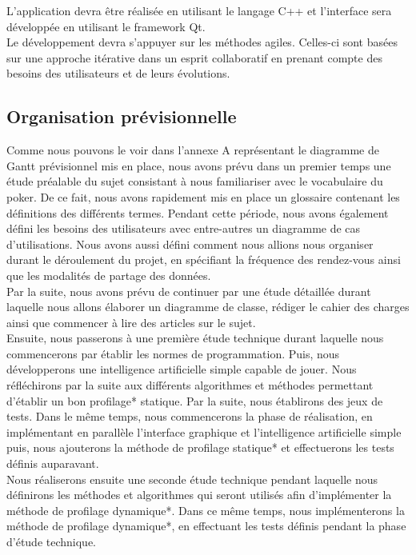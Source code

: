 \documentclass{report}
\begin{document}
L'application devra être réalisée en utilisant le langage C++ et l'interface sera développée en utilisant le framework Qt.\\

Le développement devra s'appuyer sur les méthodes agiles. Celles-ci sont basées sur une approche itérative dans un esprit collaboratif en prenant compte des besoins des utilisateurs et de leurs évolutions.\par

\subsection{Organisation prévisionnelle}

\hspace{0.5cm}Comme nous pouvons le voir dans l'annexe A représentant le diagramme de Gantt prévisionnel mis en place, nous avons prévu dans un premier temps une étude préalable du sujet consistant à nous familiariser avec le vocabulaire du poker. De ce fait, nous avons rapidement mis en place un glossaire contenant les définitions des différents termes. Pendant cette période, nous avons également défini les besoins des utilisateurs avec entre-autres un diagramme de cas d'utilisations. Nous avons aussi défini comment nous allions nous organiser durant le déroulement du projet, en spécifiant la fréquence des rendez-vous ainsi que les modalités de partage des données.\\

Par la suite, nous avons prévu de continuer par une étude détaillée durant laquelle nous allons élaborer un diagramme de classe, rédiger le cahier des charges ainsi que commencer à lire des articles sur le sujet.\\

Ensuite, nous passerons à une première étude technique durant laquelle nous commencerons par établir les normes de programmation. Puis, nous développerons une intelligence artificielle simple capable de jouer. Nous réfléchirons par la suite aux différents algorithmes et méthodes permettant d'établir un bon profilage* statique. Par la suite, nous établirons des jeux de tests. Dans le même temps, nous commencerons la phase de réalisation, en implémentant en parallèle l'interface graphique et l'intelligence artificielle simple puis, nous ajouterons la méthode de profilage statique* et effectuerons les tests définis auparavant.\\

Nous réaliserons ensuite une seconde étude technique pendant laquelle nous définirons les méthodes et algorithmes qui seront utilisés afin d'implémenter la méthode de profilage dynamique*. Dans ce même temps, nous implémenterons la méthode de profilage dynamique*, en effectuant les tests définis pendant la phase d'étude technique.\\
\end{document}

